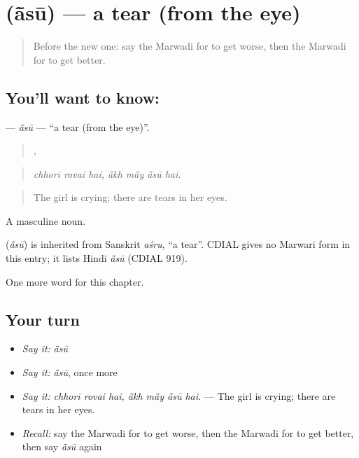 \section[\texorpdfstring{\mw{आंसू} (ā̃sū)}{आंसू (ā̃sū)}]{ (ā̃sū) — a tear (from the eye)}

\label{lesson:MW-C255-asu}



\begin{quote}
Before the new one: say the Marwadi for to get worse, then the Marwadi for to get better.
\end{quote}

\subsection*{You'll want to know: }
\textbf{} — \emph{ā̃sū} — \textquotedblleft{}a tear (from the eye)\textquotedblright{}.

\begin{quote}
  ,    
\end{quote}

\begin{quote}
\emph{chhorī rovai hai, ā̃kh mā̃y ā̃sū hai.}
\end{quote}

\begin{quote}
The girl is crying; there are tears in her eyes.
\end{quote}

A masculine noun.

\begin{cousinweb}
\textbf{} (\emph{ā̃sū}) is inherited from Sanskrit \emph{aśru}, \textquotedblleft{}a tear\textquotedblright{}. CDIAL gives no Marwari form in this entry; it lists Hindi \emph{ā̃sū} (CDIAL 919).
\end{cousinweb}

\begin{grammarlens}[title={What you've built}]
One more word for this chapter.
\end{grammarlens}

\subsection*{Your turn}
\begin{itemize}
\raggedright
  \item \emph{Say it:} \emph{ā̃sū}
  \item \emph{Say it:} \emph{ā̃sū}, once more
  \item \emph{Say it:} \emph{chhorī rovai hai, ā̃kh mā̃y ā̃sū hai.} — The girl is crying; there are tears in her eyes.
  \item \emph{Recall:} say the Marwadi for to get worse, then the Marwadi for to get better, then say \emph{ā̃sū} again
\end{itemize}

